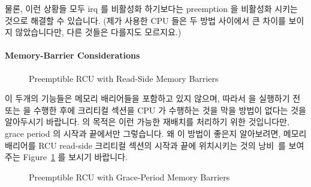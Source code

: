{	물론, 이런 상황들 모두 irq 를 비활성화 하기보다는 preemption 을
	비활성화 시키는 것으로 해결할 수 있습니다.
	(제가 사용한 CPU 들은 두 방법 사이에서 큰 차이를 보이지 않았습니다만,
	다른 것들은 다를지도 모르지요.)

} \QuickQuizEnd

\paragraph{Memory-Barrier Considerations}
\label{app:rcuimpl:Memory-Barrier Considerations}

\begin{figure}[htb]
\centering
{}
\caption{Preemptible RCU with Read-Side Memory Barriers}
\label{app:rcuimpl:Preemptible RCU with Read-Side Memory Barriers}
\end{figure}

이 두개의 기능들은 메모리 배리어들을 포함하고 있지 않으며, 따라서
 을 실행하기 전 또는  을 수행한 후에
크리티컬 섹션을 CPU 가 수행하는 것을 막을 방법이 없다는 것을 알아두시기
바랍니다.
 의 목적은 이런 가능한 재배치를 처리하기 위한
것입니다만, grace period 의 시작과 끝에서만 그렇습니다.
왜 이 방법이 좋은지 알아보려면, 메모리 배리어를 RCU read-side 크리티컬 섹션의
시작과 끝에 위치시키는 것의 낭비~\cite{PaulEMcKenney2006b}를 보여주는
Figure~\ref{app:rcuimpl:Preemptible RCU with Read-Side Memory Barriers} 를
보시기 바랍니다.

\begin{figure}[htb]
\centering
{}
\caption{Preemptible RCU with Grace-Period Memory Barriers}
\label{app:rcuimpl:Preemptible RCU with Grace-Period Memory Barriers}
\end{figure}

